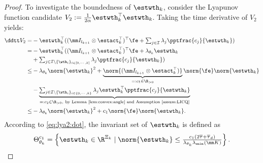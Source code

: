 \documentclass[lettersize,journal]{IEEEtran}
\begin{document}
\begin{proof}
To investigate the boundedness of $\estwth_k$, consider the Lyapunov function candidate $V_2:=\tfrac{1}{2\alpha}\estwth_k^\top \estwth_k$.
Taking the time derivative of $V_2$ yields:
\begin{equation}
    \begin{aligned}
        \ddtt  V_2 
        =& 
        -\estwth_k^\top 
        (
            (\mm I_{l_{k+1}}\otimes \estact_k^\top)^\top
            \fe
            +
            \textstyle\sum_{j\in\mathcal{I}}
            \lambda_j 
            \pptfrac{c_j}{\estwth_k}
        )
        \\
        =&
        -\estwth_k^\top 
        (
            (\mm I_{l_{k+1}}\otimes \estact_k^\top)^\top
            \fe
            +
            \lambda_{\theta_k}\estwth_k
        \\
        &
            +
            \textstyle\sum_{
                j\in\mathcal{I}\setminus \{\wth_i\}_{i\in[0,\cdots,k]}
            }
            \lambda_j 
            \pptfrac{c_j}{\estwth_k}
        )
        \\
        \le&
        -
        \lambda_{\theta_k}\norm{\estwth_k}^2
        +
        \underbrace{
            \norm{(\mm I_{l_{k+1}}\otimes {\estact}_k^\top)}
        }_{=:c_1\in\R_{>0}}
        \norm{\fe}
        \norm{\estwth_k}
        \\
        &
        -
        \underbrace{
        \textstyle\sum_{
            j\in\mathcal{I}\setminus \{\wth_i\}_{i\in\{0,\cdots,k\}}
        }
        \lambda_j 
        \estwth_k^\top \pptfrac{c_j}{\estwth_k}
        }_{=: c_2 \in\R_{>0},\ \text{by Lemma \ref{lem:convex:angle} and Assumption \ref{assum:LICQ}}}
        \\
        \le&
        -
        \lambda_{\theta_k}\norm{\estwth_k}^2
        +
        c_1     
        \norm{\fe}
        \norm{\estwth_k}
        .
    \end{aligned}
    \label{eq:lya2:dot}
\end{equation}
According to \eqref{eq:lya2:dot}, the invariant set of $\estwth_k$ is defined as
\begin{equation}
    \Theta_{\theta_k}^{c_1} 
    = 
    \left\{ 
        \estwth_k \in \R^{\Xi_{k}} 
        \mid 
        \norm{\estwth_k} 
        \le 
        \tfrac{
            c_1(2\overline\tau+\overline\tau_d)
        }{
            \lambda_{\theta_k}\lambda_{\min}(\mm K)
        }
    \right\}
    .
    \label{eq:invariant:c1:wth}
\end{equation}


\end{proof}
\end{document}
